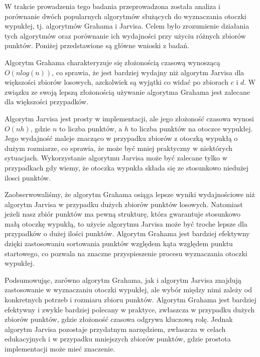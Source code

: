 \quad W trakcie prowadzenia tego badania przeprowadzona została analiza i porównanie dwóch popularnych algorytmów służących do wyznaczania otoczki wypukłej, tj. algorytmów Grahama i Jarvisa. Celem było zrozumienie działania tych algorytmów oraz porównanie ich wydajności przy użyciu różnych zbiorów punktów. 
Poniżej przedstawione są główne wnioski z  badań.
\par
Algorytm Grahama charakteryzuje się złożonością czasową wynoszącą $O(nlog(n))$, co sprawia, że jest bardziej wydajny niż algorytm Jarvisa dla większości zbiorów losowych, azckolwiek są 
wyjątki co widać po zbiorach $c$ i $d$. W związku ze swoją lepszą złożonością używanie algorytma Grahama jest zalecane dla większości przypadków.

\par
Algorytm Jarvisa jest prosty w implementacji, ale jego złożoność czasowa wynosi $O(nh)$, gdzie $n$ to liczba punktów, a $h$ to liczba punktów na otoczce wypukłej.
Jego wydajność maleje znacząco w przypadku zbiorów z otoczką wypukłą o dużym rozmiarze, co sprawia, że może być mniej praktyczny w niektórych sytuacjach.
Wykorzystanie algorytmu Jarvisa może być zalecane tylko w przypadkach gdy wiemy, że otoczka wypukła składa się ze stosunkowo niedużej ilosci punktów.

Zaobserwowaliśmy, że algorytm Grahama osiąga lepsze wyniki wydajnościowe niż algorytm Jarvisa w przypadku dużych zbiorów punktów losowych. 
Natomiast jeżeli nasz zbiór punktów ma pewną strukturę, która gwarantuje stosunkowo małą otoczkę wypukłą, to użycie algorytmu Jarvisa może być troche lepsze dla przypadków o dużej ilości punktów.
Algorytm Grahama jest bardziej efektywny dzięki zastosowaniu sortowania punktów względem kąta względem punktu startowego, co pozwala na znaczne przyspieszenie procesu wyznaczania otoczki wypukłej.

Podsumowując, zarówno algorytm Grahama, jak i algorytm Jarvisa znajdują zastosowanie w wyznaczaniu otoczki wypukłej, ale wybór między nimi zależy od konkretnych potrzeb i rozmiaru zbioru punktów. Algorytm Grahama jest bardziej efektywny i zwykle bardziej polecany w praktyce, zwłaszcza w przypadku dużych zbiorów punktów, gdzie złożoność czasowa odgrywa kluczową rolę. Jednak algorytm Jarvisa pozostaje przydatnym narzędziem, zwłaszcza w celach edukacyjnych i w przypadku mniejszych zbiorów punktów, gdzie prostota implementacji może mieć znaczenie.